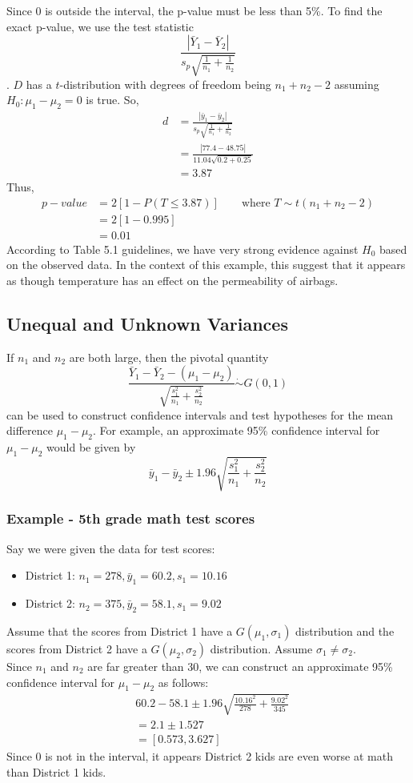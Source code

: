 \documentclass[12pt]{article}
\begin{document}
Since 0 is outside the interval, the p-value must be less than 5\%. To find the exact p-value, we use the test statistic \[\frac{|\bar Y_1-\bar Y_2|}{s_p\sqrt{\frac{1}{n_1}+\frac{1}{n_2}}}\]. $D$ has a $t$-distribution with degrees of freedom being $n_1+n_2-2$ assuming $H_0:\mu_1-\mu_2=0$ is true. So,
\begin{align*}
    d&=\frac{|\bar y_1-\bar y_2|}{s_p\sqrt{\frac{1}{n_1}+\frac{1}{n_2}}}\\
    &=\frac{|77.4-48.75|}{11.04\sqrt{0.2+0.25}}\\
    &=3.87
\end{align*}
Thus, 
\begin{align*}
    p-value &= 2[1-P(T\leq 3.87)]\qquad\text{where }T\sim t(n_1+n_2-2)\\
    &=2[1-0.995]\\
    &=0.01
\end{align*}
According to Table 5.1 guidelines, we have very strong evidence against $H_0$ based on the observed data. In the context of this example, this suggest that it appears as though temperature has an effect on the permeability of airbags.
\subsection{Unequal and Unknown Variances}
If $n_1$ and $n_2$ are both large, then the pivotal quantity \[\frac{\bar Y_1-\bar Y_2-(\mu_1-\mu_2)}{\sqrt{\frac{s_1^2}{n_1}+\frac{s_2^2}{n_2}}}\dot\sim G(0,1)\] can be used to construct confidence intervals and test hypotheses for the mean difference $\mu_1-\mu_2$. For example, an approximate 95\% confidence interval for $\mu_1-\mu_2$ would be given by \[\bar y_1-\bar y_2\pm 1.96\sqrt{\frac{s_1^2}{n_1}+\frac{s_2^2}{n_2}}\]
\subsubsection{Example - 5th grade math test scores}
Say we were given the data for test scores:
\begin{itemize}
    \item District 1: $n_1=278,\bar y_1=60.2, s_1=10.16$
    \item District 2: $n_2=375, \bar y_2=58.1,s_1=9.02$
\end{itemize}
Assume that the scores from District 1 have a $G(\mu_1,\sigma_1)$ distribution and the scores from District 2 have a $G(\mu_2,\sigma_2)$ distribution. Assume $\sigma_1\neq\sigma_2$.\\
Since $n_1$ and $n_2$ are far greater than 30, we can construct an approximate 95\% confidence interval for $\mu_1-\mu_2$ as follows:
\begin{align*}
    &60.2-58.1\pm 1.96\sqrt{\frac{10.16^2}{278}+\frac{9.02^2}{345}}\\
    &=2.1\pm 1.527\\
    &=[0.573, 3.627]
\end{align*}
Since 0 is not in the interval, it appears District 2 kids are even worse at math than District 1 kids.
\end{document}
